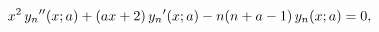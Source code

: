\[x^{2}\mathop{y_{n}\/}\nolimits''\!\left(x;a\right)+(ax+2)\mathop{y_{n}\/}%
\nolimits'\!\left(x;a\right)-n(n+a-1)\mathop{y_{n}\/}\nolimits\!\left(x;a%
\right)=0,\]
